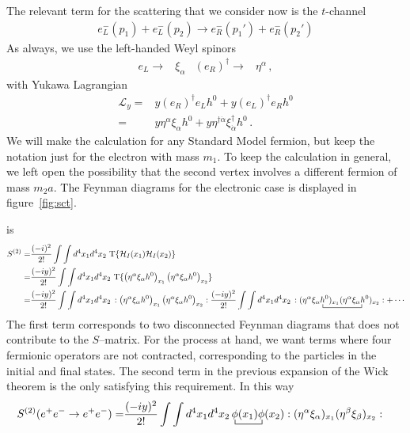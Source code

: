 The relevant term for the scattering that we consider now is the $t$-channel
\begin{align}
  e^{-}_L(p_1)+e_L^{-}(p_2)\to   e_R^{-}(p_1')+e_R^{-}(p_2')
\end{align}
As always, we use the left-handed Weyl spinors
\begin{align}
  e_L\to &\xi_{\alpha} &   \left( e_R \right)^{\dagger}\to &\eta^{\alpha}\,,
\end{align}
with Yukawa Lagrangian
\begin{align}
  \mathcal{L}_y=& y \left(e_R\right)^{\dagger} e_L h^0 +y \left(e_L\right)^{\dagger} e_R h^0 \nonumber\\
               =& y \eta^{\alpha} \xi_{\alpha}h^0 + y \eta^{\dagger\dot{\alpha}} \xi_{\dot{\alpha}}^{\dagger}h^0\,. 
\end{align}
We will make the calculation for any Standard Model fermion, but keep the notation just for the electron with mass $m_1$. To keep the calculation in general, we left open the possibility that the second vertex involves a different fermion of mass $m_2a$. The Feynman diagrams for the electronic case is displayed in figure~\ref{fig:sct}.

is
\begin{align}
S^{(2)}=&  \frac{(-i)^2}{2!}\int\int d^4x_1 d^4x_2\,\operatorname{T}\{\mathcal{H}_I(x_1)\mathcal{H}_I(x_2)\}\nonumber\\
=&  \frac{(-iy)^2}{2!}\int\int d^4x_1 d^4x_2\,\operatorname{T}\{\left( \eta^{\alpha} \xi_{\alpha}h^0 \right)_{x_1} \left( \eta^{\alpha} \xi_{\alpha}h^0 \right)_{x_2}\}\nonumber\\
=& 
 \frac{(-iy)^2}{2!}\int\int d^4x_1 d^4x_2\,:\left( \eta^{\alpha} \xi_{\alpha}h^0 \right)_{x_1} \left( \eta^{\alpha} \xi_{\alpha}h^0 \right)_{x_2}:
 \frac{(-iy)^2}{2!}\int\int d^4x_1 d^4x_2\,:( \eta^{\alpha} 
\bcontraction{\xi_{\alpha}}{\phi}{)_{x_1}(\eta^{\alpha} \xi_{\alpha}}{h^0}
\xi_{\alpha} h^0)_{x_1}(\eta^{\alpha} \xi_{\alpha}h^0 
)_{x_2}:+\cdots
\end{align}
The first term corresponds to two  disconnected Feynman diagrams that does not contribute to the $S$--matrix. For the process at hand, we want terms where four fermionic operators are not contracted, corresponding to the particles in the initial and final states. The second term in the previous expansion of the Wick theorem is the only satisfying this requirement. In this way
\begin{align}
  S^{(2)}(e^+ e^-\to e^+e^-)=&\frac{(-iy)^2}{2!}\int\int d^4x_1 d^4x_2
\bcontraction{\,}{\phi}{(x_1)}{\phi}
\,\phi(x_1)\phi(x_2):(\eta^{\alpha} \xi_{\alpha})_{x_1}(\eta^{\beta} \xi_{\beta})_{x_2}:
\end{align}

